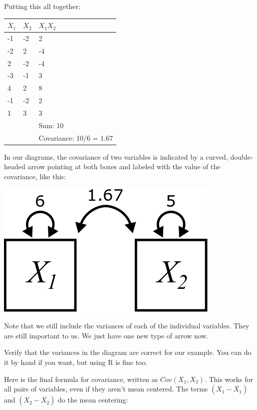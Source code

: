 \documentclass[
]{book}
\begin{document}
Putting this all together:

\begin{longtable}[]{@{}lll@{}}
\toprule
\(X_{1}\) & \(X_{2}\) & \(X_{1}X_{2}\) \\
\midrule
\endhead
-1 & -2 & 2 \\
-2 & 2 & -4 \\
2 & -2 & -4 \\
-3 & -1 & 3 \\
4 & 2 & 8 \\
-1 & -2 & 2 \\
1 & 3 & 3 \\
& & Sum: 10 \\
& & Covariance: 10/6 = \(\boxed{1.67}\) \\
\bottomrule
\end{longtable}

In our diagrams, the covariance of two variables is indicated by a curved, double-headed arrow pointing at both boxes and labeled with the value of the covariance, like this:

\begin{center}\includegraphics{graphics/covariance_labeled} \end{center}

Note that we still include the variances of each of the individual variables. They are still important to us. We just have one new type of arrow now.

Verify that the variances in the diagram are correct for our example. You can do it by hand if you want, but using R is fine too.

Here is the final formula for covariance, written as \(Cov\left(X_{1}, X_{2}\right)\). This works for all pairs of variables, even if they aren't mean centered. The terms \(\left(X_{1} - \overline{X_1}\right)\) and \(\left(X_{2} - \overline{X_2}\right)\) do the mean centering:
\end{document}
